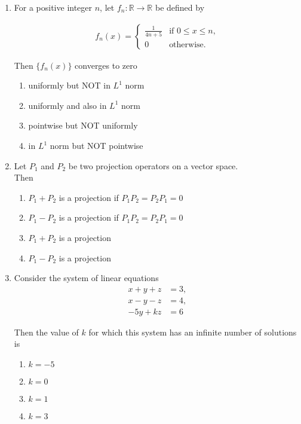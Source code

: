 \documentclass[journal]{IEEEtran}
\numberwithin{equation}{enumi}
\numberwithin{figure}{enumi}
\begin{document}
\begin{enumerate}
\item For a positive integer $n$, let $f_n : \mathbb{R} \to \mathbb{R}$ be defined by

\begin{align*}
f_n(x) = 
\begin{cases}
\frac{1}{4n + 5} & \text{if } 0 \leq x \leq n, \\
0 & \text{otherwise}.
\end{cases}
\end{align*}

Then $\{f_n(x)\}$ converges to zero
\hfill{}
\begin{enumerate}
    \item uniformly but NOT in $L^1$ norm
    \item uniformly and also in $L^1$ norm
    \item pointwise but NOT uniformly
    \item in $L^1$ norm but NOT pointwise
\end{enumerate}


\item Let $P_1$ and $P_2$ be two projection operators on a vector space. \\ 
Then 
\hfill{}
\begin{enumerate}
    \item $P_1 + P_2$ is a projection if $P_1 P_2 = P_2 P_1 = 0$
    \item $P_1 - P_2$ is a projection if $P_1 P_2 = P_2 P_1 = 0$
    \item $P_1 + P_2$ is a projection
    \item $P_1 - P_2$ is a projection
\end{enumerate}



\item Consider the system of linear equations         \hfill{}
\begin{align*}
x + y + z &= 3 ,\\ 
x - y - z &= 4 , \\
-5y + kz &= 6
\end{align*}

Then the value of $k$ for which this system has an infinite number of solutions is

\begin{enumerate}
    \item $k = -5$
    \item $k = 0$
    \item $k = 1$
    \item $k = 3$
\end{enumerate}




\end{enumerate}
\end{document}
